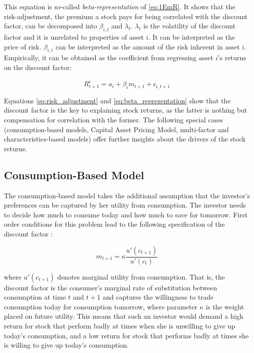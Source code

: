  		This equation is so-called \textit{beta-representation} of \ref{eq:1EmR}. It shows that the risk-adjustment, the premium a stock pays for being correlated with the discount factor, can be decomposed into $\beta_{i,t}$ and $\lambda_t$. $\lambda_t$ is the volatility of the discount factor and it is unrelated to properties of asset $i$. It can be interpreted as the price of risk. $\beta_{i,t}$ can be interpreted as the amount of the risk inherent in asset $i$. Empirically, it can be obtained as the coefficient from regressing asset $i$'s returns on the discount factor: 
 		
 		\begin{equation}
 		R_{t+1}^i = a_i + \beta_{i}m_{t+1} + \epsilon_{i,t+1}
 		\end{equation} 
 		
 		Equations \ref{eq:risk_adjustment} and \ref{eq:beta_reprezentation} show that the discount factor is the key to explaining stock returns, as the latter is nothing but compensation for correlation with the former. The following special cases (consumption-based models, Capital Asset Pricing Model, multi-factor and characteristics-based models) offer further insights about the drivers of the stock returns.    
 			 	
	 	\subsection{Consumption-Based Model}
	 	
		 	The consumption-based model takes the additional assumption that the investor's preferences can be captured by her utility from consumption. The investor needs to decide how much to consume today and how much to save for tomorrow. First order conditions for this problem lead to the following specification of the discount factor \cite{cochrane2009asset}: 
		 	
		 	\begin{equation}
		 		m_{t+1} = \kappa \frac{u'(c_{t+1})}{u'(c_t)} \label{consumtion_based_model}
		 	\end{equation}
		 	
		 	where $u'(c_{t+1})$ denotes marginal utility from consumption. That is, the discount factor is the consumer's  marginal rate of substitution between consumption at time $t$ and $t+1$ and captures the willingness to trade consumption today for consumption tomorrow, where parameter $\kappa$ is the weight placed on future utility.  This means that such an investor would demand a high return for stock that perform badly at times when she is unwilling to give up today's consumption, and a low return for stock that performs badly at times she is willing to give up today's consumption. 
		 	

